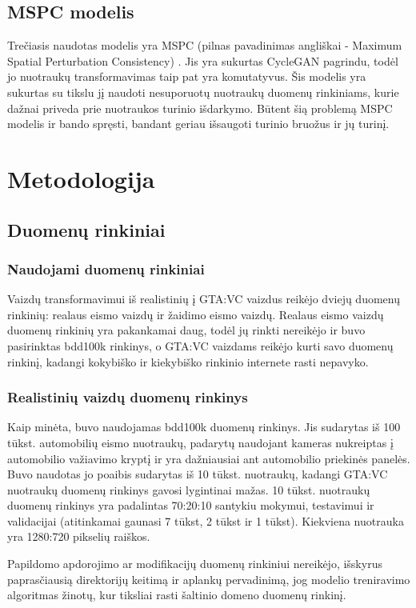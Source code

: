 \documentclass{VUMIFPSkursinis}
\begin{document}
    \subsection{MSPC modelis}
        Trečiasis naudotas modelis yra MSPC (pilnas pavadinimas angliškai - Maximum Spatial Perturbation Consistency) \cite{Mspc}. Jis yra sukurtas CycleGAN \cite{CycleGAN2017} pagrindu, todėl jo nuotraukų transformavimas taip pat yra komutatyvus. Šis modelis yra sukurtas su tikslu jį naudoti nesuporuotų nuotraukų duomenų rinkiniams, kurie dažnai priveda prie nuotraukos turinio išdarkymo. Būtent šią problemą MSPC modelis ir bando spręsti, bandant geriau išsaugoti turinio bruožus ir jų turinį. 
\section{Metodologija}
    \subsection{Duomenų rinkiniai}
        \subsubsection{Naudojami duomenų rinkiniai}
            Vaizdų transformavimui iš realistinių į GTA:VC vaizdus reikėjo dviejų duomenų rinkinių: realaus eismo vaizdų ir žaidimo eismo vaizdų. Realaus eismo vaizdų duomenų rinkinių yra pakankamai daug, todėl jų rinkti nereikėjo ir buvo pasirinktas bdd100k rinkinys, o GTA:VC vaizdams reikėjo kurti savo duomenų rinkinį, kadangi kokybiško ir kiekybiško rinkinio internete rasti nepavyko. 
        \subsubsection{Realistinių vaizdų duomenų rinkinys}
            Kaip minėta, buvo naudojamas bdd100k duomenų rinkinys. Jis sudarytas iš 100 tūkst. automobilių eismo nuotraukų, padarytų naudojant kameras nukreiptas į automobilio važiavimo kryptį ir yra dažniausiai ant automobilio priekinės panelės. Buvo naudotas jo poaibis sudarytas iš 10 tūkst. nuotraukų, kadangi GTA:VC nuotraukų duomenų rinkinys gavosi lygintinai mažas. 10 tūkst. nuotraukų duomenų rinkinys yra padalintas 70:20:10 santykiu mokymui, testavimui ir validacijai (atitinkamai gaunasi 7 tūkst, 2 tūkst ir 1 tūkst). Kiekviena nuotrauka yra 1280:720 pikselių raiškos.

            Papildomo apdorojimo ar modifikacijų duomenų rinkiniui nereikėjo, išskyrus paprasčiausią direktorijų keitimą ir aplankų pervadinimą, jog modelio treniravimo algoritmas žinotų, kur tiksliai rasti šaltinio domeno duomenų rinkinį.
\end{document}
